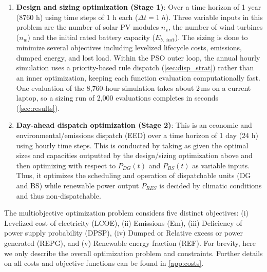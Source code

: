 \documentclass[final,3p,times]{elsarticle}
\begin{document}
\begin{enumerate}
    \item \textbf{Design and sizing optimization (Stage 1)}: Over a time horizon of 1 year (8760 h) using time steps of 1 h each ($\Delta t = 1\;h$). Three variable inputs in this problem are the number of solar PV modules $n_s$, the number of wind turbines ($n_w$) and the initial rated battery capacity ($E_{b,\;init}$). The sizing is done to minimize several objectives including levelized lifecycle costs, emissions, dumped energy, and lost load. Within the PSO outer loop, the annual hourly simulation uses a priority-based rule dispatch (\cref{sec:disp_strat}) rather than an inner optimization, keeping each function evaluation computationally fast. One evaluation of the 8,760-hour simulation takes about 2\,ms on a current laptop, so a sizing run of 2,000 evaluations completes in seconds (\cref{sec:results}).
    \item \textbf{Day-ahead dispatch optimization (Stage 2)}: This is an economic and environmental/emissions dispatch (EED) over a time horizon of 1 day (24 h) using hourly time steps. This is conducted by taking as given the optimal sizes and capacities outputted by the design/sizing optimization above and then optimizing with respect to $P_{DG}(t)$ and $P_{BS}(t)$ as variable inputs. Thus, it optimizes the scheduling and operation of dispatchable units (DG and BS) while renewable power output $P_{RES}$ is decided by climatic conditions and thus non-dispatchable.
\end{enumerate}

The multiobjective optimization problem considers five distinct objectives: (i) Levelized cost of electricity (LCOE), (ii) Emissions (Em), (iii) Deficiency of power supply probability (DPSP), (iv) Dumped or Relative excess or power generated (REPG), and (v) Renewable energy fraction (REF). For brevity, here we only describe the overall optimization problem and constraints. Further details on all costs and objective functions can be found in \cref{app:costs}. 
\end{document}
